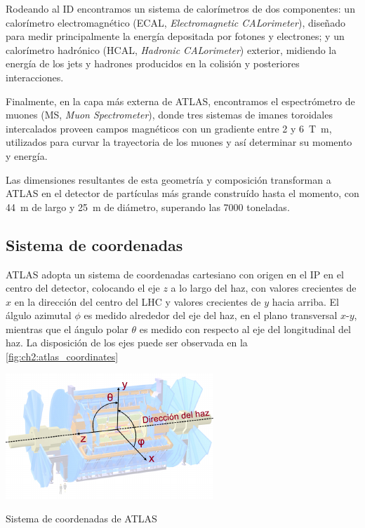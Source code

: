 Rodeando al ID encontramos un sistema de calorímetros de dos componentes: un calorímetro electromagnético (ECAL, \textit{Electromagnetic CALorimeter}), diseñado para medir principalmente la energía depositada por fotones y electrones; y un calorímetro hadrónico (HCAL, \textit{Hadronic CALorimeter}) exterior, midiendo la energía de los jets y hadrones producidos en la colisión y posteriores interacciones.

Finalmente, en la capa más externa de ATLAS, encontramos el espectrómetro de muones (MS, \textit{Muon Spectrometer}), donde tres sistemas de imanes toroidales intercalados proveen campos magnéticos con un gradiente entre \num{2} y \SI{6}{\tesla\meter}, utilizados para curvar la trayectoria de los muones y así determinar su momento y energía.

Las dimensiones resultantes de esta geometría y composición transforman a ATLAS en el detector de partículas más grande construído hasta el momento, con \SI{44}{\meter} de largo y \SI{25}{\meter} de diámetro, superando las \num{7000} toneladas.




\subsection{Sistema de coordenadas} \label{sec:ch2:atlas_coordinates}

ATLAS adopta un sistema de coordenadas cartesiano con origen en el IP en el centro del detector, colocando el eje $z$ a lo largo del haz, con valores crecientes de $x$ en la dirección del centro del LHC y valores crecientes de $y$ hacia arriba. El álgulo azimutal $\phi$ es medido alrededor del eje del haz, en el plano transversal $x$-$y$, mientras que el ángulo polar $\theta$ es medido con respecto al eje del longitudinal del haz. La disposición de los ejes puede ser observada en la \cref{fig:ch2:atlas_coordinates}

\begin{marginfigure}
    \includegraphics[width=\linewidth]{Assets/Images/ATLAS_coordinates.pdf}
    \caption{Sistema de coordenadas de ATLAS}
    \label{fig:ch2:atlas_coordinates}
\end{marginfigure}

